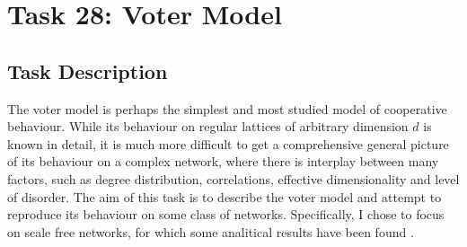\chapter{Task 28: Voter Model}

\section{Task Description}
The voter model is perhaps the simplest and most studied model of cooperative behaviour. While its behaviour on regular lattices of arbitrary dimension $d$ is known in detail, it is much more difficult to get a comprehensive general picture of its behaviour on a complex network, where there is interplay between many factors, such as degree distribution, correlations, effective dimensionality and level of disorder\cite{suchecki_numerical}. 
The aim of this task is to describe the voter model and attempt to reproduce its behaviour on some class of networks. Specifically, I chose to focus on scale free networks, for which some analitical results have been found \cite{sood}. 

